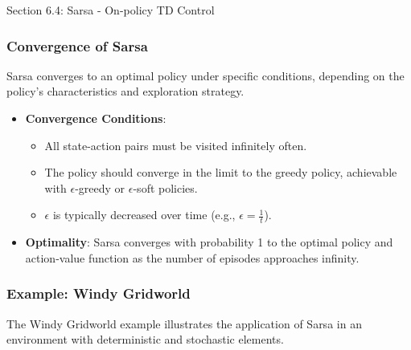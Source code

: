 \begin{notes}{Section 6.4: Sarsa - On-policy TD Control}
\begin{highlight}
    \end{highlight}
    
    \subsubsection*{Convergence of Sarsa}
    
    Sarsa converges to an optimal policy under specific conditions, depending on the policy's characteristics and exploration strategy.
    
    \begin{highlight}
    
        \begin{itemize}
            \item \textbf{Convergence Conditions}:
                \begin{itemize}
                    \item All state-action pairs must be visited infinitely often.
                    \item The policy should converge in the limit to the greedy policy, achievable with $\epsilon$-greedy or $\epsilon$-soft policies.
                    \item $\epsilon$ is typically decreased over time (e.g., $\epsilon = \frac{1}{t}$).
                \end{itemize}
            \item \textbf{Optimality}: Sarsa converges with probability 1 to the optimal policy and action-value function as the number of episodes approaches infinity.
        \end{itemize}
    
    \end{highlight}
    
    \subsubsection*{Example: Windy Gridworld}
    
    The Windy Gridworld example illustrates the application of Sarsa in an environment with deterministic and stochastic elements.
    
    \begin{highlight}
    

\end{highlight}
\end{notes}
